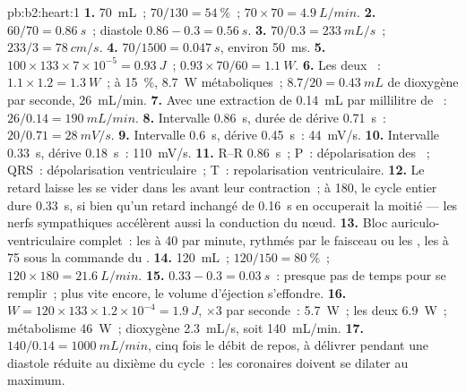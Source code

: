 \begin{solution}{pb:b2:heart:1}
\textbf{1.} \qty{70}{mL}~; $70/130 = \qty{54}{\%}$~; $70\times 70 =
\qty{4.9}{L/min}$.
\textbf{2.} $60/70 = \qty{0.86}{s}$~; diastole $0.86 - 0.3 =
\qty{0.56}{s}$.
\textbf{3.} $70/0.3 = \qty{233}{mL/s}$~; $233/3 = \qty{78}{cm/s}$.
\textbf{4.} $70/1500 = \qty{0.047}{s}$, environ \qty{50}{ms}.
\textbf{5.} $100\times 133\times 7\times 10^{-5} = \qty{0.93}{J}$~;
$0.93\times 70/60 = \qty{1.1}{W}$.
\textbf{6.} Les deux ~: $1.1\times 1.2 = \qty{1.3}{W}$~; à
\qty{15}{\%}, \qty{8.7}{W} métaboliques~; $8.7/20 = \qty{0.43}{mL}$ de
dioxygène par seconde, \qty{26}{mL/min}.
\textbf{7.} Avec une extraction de \qty{0.14}{mL} par millilitre de
~: $26/0.14 = \qty{190}{mL/min}$.
\textbf{8.} Intervalle \qty{0.86}{s}, durée de dérive \qty{0.71}{s}~:
$20/0.71 = \qty{28}{mV/s}$.
\textbf{9.} Intervalle \qty{0.6}{s}, dérive \qty{0.45}{s}~:
\qty{44}{mV/s}.
\textbf{10.} Intervalle \qty{0.33}{s}, dérive \qty{0.18}{s}~:
\qty{110}{mV/s}.
\textbf{11.} R--R \qty{0.86}{s}~; P~: dépolarisation des ~;
QRS~: dépolarisation ventriculaire~; T~: repolarisation ventriculaire.
\textbf{12.} Le retard laisse les  se vider dans les
 avant leur contraction~; à 180, le cycle entier dure
\qty{0.33}{s}, si bien qu'un retard inchangé de \qty{0.16}{s} en
occuperait la moitié --- les nerfs sympathiques accélèrent aussi la
conduction du nœud.
\textbf{13.} Bloc auriculo-ventriculaire complet~: les  à 40
par minute, rythmés par le faisceau ou les , les
 à 75 sous la commande du .
\textbf{14.} \qty{120}{mL}~; $120/150 = \qty{80}{\%}$~; $120\times 180 =
\qty{21.6}{L/min}$.
\textbf{15.} $0.33 - 0.3 = \qty{0.03}{s}$~: presque pas de temps pour se
remplir~; plus vite encore, le volume d'éjection s'effondre.
\textbf{16.} $W = 120\times 133\times 1.2\times 10^{-4} = \qty{1.9}{J}$,
$\times 3$ par seconde~: \qty{5.7}{W}~; les deux 
\qty{6.9}{W}~; métabolisme \qty{46}{W}~; dioxygène \qty{2.3}{mL/s}, soit
\qty{140}{mL/min}.
\textbf{17.} $140/0.14 = \qty{1000}{mL/min}$, cinq fois le débit de
repos, à délivrer pendant une diastole réduite au dixième du cycle~: les
 coronaires doivent se dilater au maximum.

\end{solution}

